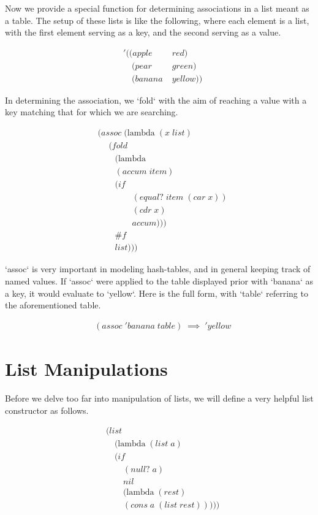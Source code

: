 Now we provide a special function for determining associations in a list meant as 
a table. The setup of these lists is like the following, where each element is a 
list, with the first element serving as a key, and the second serving as a value.

\begin{align*}
& '((apple \; &red)
\\& \quad (pear \; &green)
\\& \quad (banana \; &yellow))
\end{align*}

In determining the association, we `fold` with the aim of reaching a value with a 
key matching that for which we are searching.

\begin{align*}
& (assoc \; (\text{lambda} \; (x \; list)
\\& \quad \; (fold \; 
\\& \qquad (\text{lambda} \; 
\\& \qquad (accum \; item) \; 
\\& \qquad (if \; 
\\& \qquad \qquad (equal? \; item \; (car \; x))
\\& \qquad \qquad (cdr \; x)
\\& \qquad \qquad accum)))
\\& \qquad \#f
\\& \qquad list)))
\end{align*}

`assoc` is very important in modeling hash-tables, and in general keeping track of 
named values. If `assoc` were applied to the table displayed prior with `banana` 
as a key, it would evaluate to `yellow`. Here is the full form, with `table` 
referring to the aforementioned table.

\begin{align*}
& (assoc \; 'banana \; table) \; \implies \; 'yellow
\end{align*}

\section{List Manipulations}
Before we delve too far into manipulation of lists, we will define a very helpful 
list constructor as follows.

\begin{align*}
& (list \; 
\\& \quad (\text{lambda} \; (list \; a) \; 
\\& \quad (if
\\& \qquad (null? \; a)
\\& \qquad nil
\\& \qquad (\text{lambda} \; (rest)
\\& \qquad (cons \; a \; (list \; rest)))))
\end{align*}

